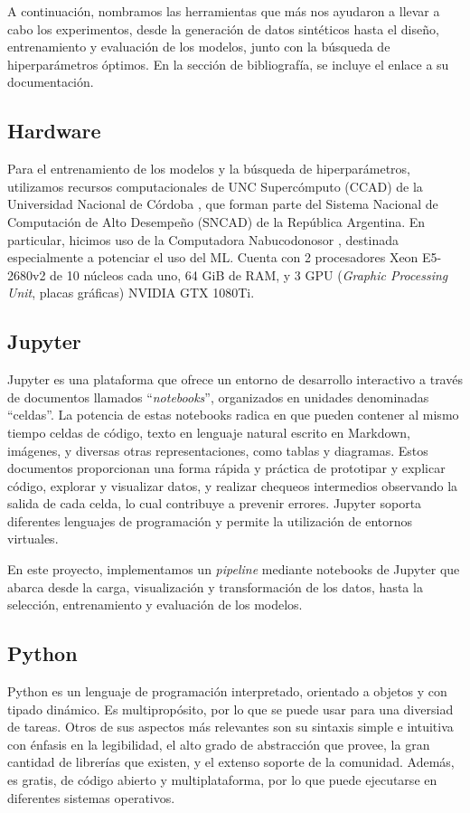\documentclass[../../main.tex]{subfiles}
\begin{document}
A continuación, nombramos las herramientas que más nos ayudaron a llevar a cabo los
experimentos, desde la generación de datos sintéticos hasta el diseño, entrenamiento y
evaluación de los modelos, junto con la búsqueda de hiperparámetros óptimos. En la
sección de bibliografía, se incluye el enlace a su documentación.

\subsection{Hardware}
Para el entrenamiento de los modelos y la búsqueda de hiperparámetros, utilizamos recursos
computacionales de UNC Supercómputo (CCAD) de la Universidad Nacional de Córdoba
\cite{ccad}, que forman parte del Sistema Nacional de Computación de Alto Desempeño
(SNCAD) de la República Argentina. En particular, hicimos uso de la Computadora
Nabucodonosor \cite{nabu}, destinada especialmente a potenciar el uso del ML. Cuenta con 2
procesadores Xeon E5-2680v2 de 10 núcleos cada uno, 64 GiB de RAM, y 3 GPU
(\textit{Graphic Processing Unit}, placas gráficas) NVIDIA GTX 1080Ti.

\subsection{Jupyter}
Jupyter \cite{jupyter-docs} es una plataforma que ofrece un entorno de desarrollo
interactivo a través de documentos llamados ``\textit{notebooks}'', organizados en
unidades denominadas ``celdas''. La potencia de estas notebooks radica en que pueden
contener al mismo tiempo celdas de código, texto en lenguaje natural escrito en Markdown,
imágenes, y diversas otras representaciones, como tablas y diagramas. Estos documentos
proporcionan una forma rápida y práctica de prototipar y explicar código, explorar y
visualizar datos, y realizar chequeos intermedios observando la salida de cada celda, lo
cual contribuye a prevenir errores. Jupyter soporta diferentes lenguajes de programación y
permite la utilización de entornos virtuales.

En este proyecto, implementamos un \textit{pipeline} mediante notebooks de Jupyter que
abarca desde la carga, visualización y transformación de los datos, hasta la selección,
entrenamiento y evaluación de los modelos.

\subsection{Python}
Python \cite{python-docs} es un lenguaje de programación interpretado, orientado a objetos
y con tipado dinámico. Es multipropósito, por lo que se puede usar para una diversiad de
tareas. Otros de sus aspectos más relevantes son su sintaxis simple e intuitiva con
énfasis en la legibilidad, el alto grado de abstracción que provee, la gran cantidad de
librerías que existen, y el extenso soporte de la comunidad. Además, es gratis, de código
abierto y multiplataforma, por lo que puede ejecutarse en diferentes sistemas operativos.
\end{document}
